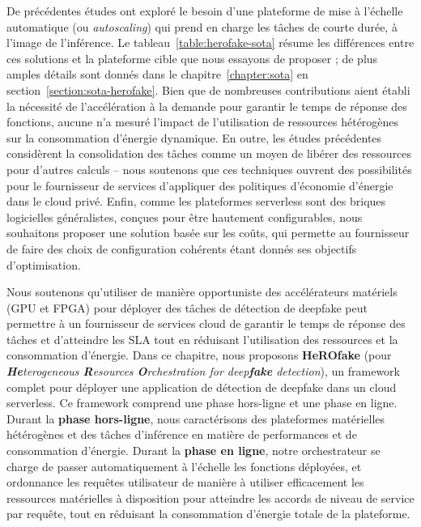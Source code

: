 De précédentes études ont exploré le besoin d'une plateforme de mise à l'échelle automatique (ou \textit{autoscaling}) qui prend en charge les tâches de courte durée, à l'image de l'inférence. Le tableau~\ref{table:herofake-sota} résume les différences entre ces solutions et la plateforme cible que nous essayons de proposer ; de plus amples détails sont donnés dans le chapitre~\ref{chapter:sota} en section~\ref{section:sota-herofake}. Bien que de nombreuses contributions aient établi la nécessité de l'accélération à la demande pour garantir le temps de réponse des fonctions, aucune n'a mesuré l'impact de l'utilisation de ressources hétérogènes sur la consommation d'énergie dynamique. En outre, les études précédentes considèrent la consolidation des tâches comme un moyen de libérer des ressources pour d'autres calculs -- nous soutenons que ces techniques ouvrent des possibilités pour le fournisseur de services d'appliquer des politiques d'économie d'énergie dans le cloud privé. Enfin, comme les plateformes serverless sont des briques logicielles généralistes, conçues pour être hautement configurables, nous souhaitons proposer une solution basée sur les coûts, qui permette au fournisseur de faire des choix de configuration cohérents étant donnés ses objectifs d'optimisation.

Nous soutenons qu'utiliser de manière opportuniste des accélérateurs matériels (GPU et FPGA) pour déployer des tâches de détection de deepfake peut permettre à un fournisseur de services cloud de garantir le temps de réponse des tâches et d'atteindre les SLA tout en réduisant l'utilisation des ressources et la consommation d'énergie. Dans ce chapitre, nous proposons \textbf{HeROfake} (pour \textit{\textbf{He}terogeneous \textbf{R}esources \textbf{O}rchestration for deep\textbf{fake} detection}), un framework complet pour déployer une application de détection de deepfake dans un cloud serverless. Ce framework comprend une phase hors-ligne et une phase en ligne. Durant la \textbf{phase hors-ligne}, nous caractérisons des plateformes matérielles hétérogènes et des tâches d'inférence en matière de performances et de consommation d'énergie. Durant la \textbf{phase en ligne}, notre orchestrateur se charge de passer automatiquement à l'échelle les fonctions déployées, et ordonnance les requêtes utilisateur de manière à utiliser efficacement les ressources matérielles à disposition pour atteindre les accords de niveau de service par requête, tout en réduisant la consommation d'énergie totale de la plateforme.

